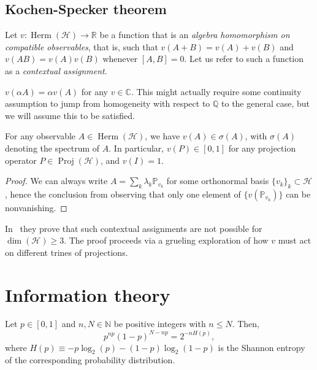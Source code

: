 \documentclass[a4paper]{report}
\newcommand{\CC}{\mathbb{C}}
\newcommand{\NN}{\mathbb{N}}
\newcommand{\PP}{\mathbb{P}}
\newcommand{\QQ}{\mathbb{Q}}
\newcommand{\RR}{\mathbb{R}}
\newcommand{\on}[1]{\operatorname{#1}}
\newcommand{\calH}{{\mathcal{H}}}
\DeclareMathOperator{\Herm}{Herm}
\begin{document}
\section{Kochen-Specker theorem}

\begin{defn}
	Let $v:\Herm(\calH)\to\RR$ be a function that is an \emph{algebra homomorphism on compatible observables}, that is, such that $v(A+B)=v(A)+v(B)$ and $v(AB)=v(A)v(B)$ whenever $[A,B]=0$.
	Let us refer to such a function as a \emph{contextual assignment}.
\end{defn}

\begin{prop}
	$v(\alpha A)=\alpha v(A)$ for any $v\in \CC$. This might actually require some continuity assumption to jump from homogeneity with respect to $\QQ$ to the general case, but we will assume this to be satisfied.
\end{prop}

\begin{prop}
	For any observable $A\in\Herm(\calH)$, we have $v(A)\in\sigma(A)$, with $\sigma(A)$ denoting the spectrum of $A$. In particular, $v(P)\in[0,1]$ for any projection operator $P\in\on{Proj}(\calH)$, and $v(I)=1$.
\end{prop}
\begin{proof}
	We can always write $A=\sum_k\lambda_k \PP_{v_k}$ for some orthonormal basis $\{v_k\}_k\subset\calH$, hence the conclusion from observing that only one element of $\{v(\PP_{v_k})\}$ can be nonvanishing.
\end{proof}

In~\parencite{cabello1994simple} they prove that such contextual assignments are not possible for $\on{dim}(\calH)\ge3$. The proof proceeds via a grueling exploration of how $v$ must act on different trines of projections.




\chapter{Information theory}

\begin{prop}
	Let $p\in[0,1]$ and $n,N\in\NN$ be positive integers with $n\le N$.
	Then,
	\begin{equation}
		p^{np} (1-p)^{N-np}
		= 2^{-nH(p)},
	\end{equation}
	where $H(p)\equiv -p\log_2(p)-(1-p)\log_2(1-p)$ is the Shannon entropy of the corresponding probability distribution.
\end{prop}
\end{document}
